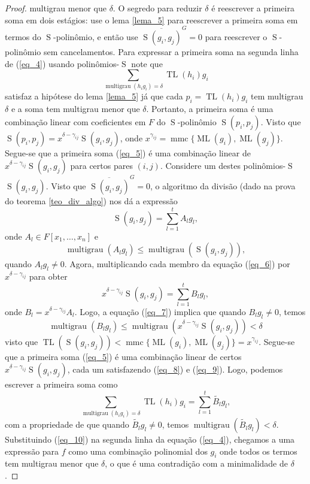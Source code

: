 \documentclass[12pt,a4paper]{report}
\numberwithin{theorem}{chapter}
\DeclareMathOperator{\multigrau}{multigrau}
\DeclareMathOperator{\ML}{ML}
\DeclareMathOperator{\TL}{TL}
\DeclareMathOperator{\mmc}{mmc}
\DeclareMathOperator{\Sp}{S}
\begin{document}
\begin{proof}
  multigrau menor que \(\delta\).  O segredo para reduzir \(\delta\) é
  reescrever a primeira soma em dois estágios: use o lema \ref{lema_5}
  para reescrever a primeira soma em termos do \(\Sp\)-polinômio, e
  então use \(\overline{\Sp(g_i,g_j)}^G = 0\) para reescrever o
  \(\Sp\)-polinômio sem cancelamentos.  Para expressar a primeira soma
  na segunda linha de (\ref{eq_4}) usando polinômios-\(\Sp\) note que
  \begin{equation}\label{eq_5}
    \sum_{\multigrau(h_ig_i) = \delta}{\TL(h_i)g_i}
  \end{equation}
  satisfaz a hipótese do lema \ref{lema_5} já que cada \(p_i =
  \TL(h_i)g_i\) tem multigrau \(\delta\) e a soma tem multigrau menor
  que \(\delta\).  Portanto, a primeira soma é uma combinação linear
  com coeficientes em \(F\) do \(\Sp\)-polinômio \(\Sp(p_i,p_j)\).
  Visto que \(\Sp(p_i,p_j) = x^{\delta-\gamma_{ij}}\Sp(g_i,g_j)\),
  onde \(x^{\gamma_{ij}} = \mmc\{\ML(g_i),\ML(g_j)\}\).  Segue-se que
  a primeira soma (\ref{eq_5}) é uma combinação linear de
  \(x^{\delta-\gamma_{ij}}\Sp(g_i,g_j)\) para certos pares \((i,j)\).
  Considere um destes polinômios-\(\Sp\) \(\Sp(g_i,g_j)\).  Visto que
  \(\overline{\Sp(g_i,g_j)}^G = 0\), o algoritmo da divisão (dado na
  prova do teorema \ref{teo_div_algo}) nos dá a expressão
  \begin{equation}\label{eq_6}
    \Sp(g_i,g_j) = \sum_{l=1}^t{A_lg_l},
  \end{equation}
  onde \(A_l \in F[x_1,\ldots,x_n]\) e
  \begin{equation}\label{eq_7}
    \multigrau(A_lg_l) \leq \multigrau(\Sp(g_i,g_j)),
  \end{equation}
  quando \(A_lg_l \neq 0\).  Agora, multiplicando cada membro da
  equação (\ref{eq_6}) por \(x^{\delta-\gamma_{ij}}\) para obter
  \begin{equation}\label{eq_8}
    x^{\delta-\gamma_{ij}}\Sp(g_i,g_j) = \sum_{l=1}^t{B_lg_l},
  \end{equation}
  onde \(B_l = x^{\delta-\gamma_{ij}}A_l\).  Logo, a equação
  (\ref{eq_7}) implica que quando \(B_lg_l \neq 0\), temos
  \begin{equation}\label{eq_9}
    \multigrau(B_lg_l) \leq
    \multigrau(x^{\delta-\gamma_{ij}}\Sp(g_i,g_j)) < \delta
  \end{equation}
  visto que \(\TL(\Sp(g_i,g_j)) < \mmc\{\ML(g_i),\ML(g_j)\} =
  x^{\gamma_{ij}}\).  Segue-se que a primeira soma (\ref{eq_5}) é uma
  combinação linear de certos \(x^{\delta-\gamma_{ij}}\Sp(g_i,g_j)\),
  cada um satisfazendo (\ref{eq_8}) e (\ref{eq_9}).  Logo, podemos
  escrever a primeira soma como
  \begin{equation}\label{eq_10}
    \sum_{\multigrau(h_ig_i) = \delta}{\TL(h_i)g_i} = \sum_{l=1}^t{\tilde{B_l}g_l},
  \end{equation}
  com a propriedade de que quando \(\tilde{B_l}g_l \neq 0\), temos
  \(\multigrau(\tilde{B_l}g_l) < \delta\).  Substituindo (\ref{eq_10})
  na segunda linha da equação (\ref{eq_4}), chegamos a uma expressão
  para \(f\) como uma combinação polinomial dos \(g_i\) onde todos os
  termos tem multigrau menor que \(\delta\), o que é uma contradição
  com a minimalidade de \(\delta\).
\end{proof}
\end{document}
